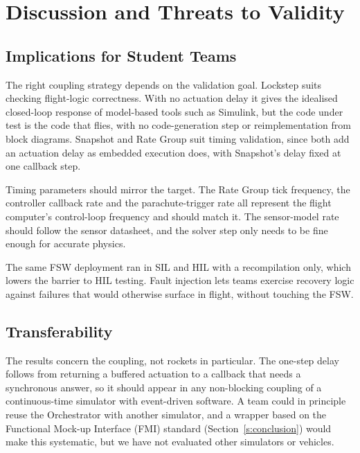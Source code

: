 \section{Discussion and Threats to Validity}\label{discussion}

\subsection{Implications for Student Teams}
The right coupling strategy depends on the validation goal. Lockstep suits checking flight-logic correctness. With no actuation delay it gives the idealised closed-loop response of model-based tools such as Simulink, but the code under test is the code that flies, with no code-generation step or reimplementation from block diagrams. Snapshot and Rate Group suit timing validation, since both add an actuation delay as embedded execution does, with Snapshot's delay fixed at one callback step.

Timing parameters should mirror the target. The Rate Group tick frequency, the controller callback rate and the parachute-trigger rate all represent the flight computer's control-loop frequency and should match it. The sensor-model rate should follow the sensor datasheet, and the solver step only needs to be fine enough for accurate physics.

The same FSW deployment ran in SIL and HIL with a recompilation only, which lowers the barrier to HIL testing. Fault injection lets teams exercise recovery logic against failures that would otherwise surface in flight, without touching the FSW.

\subsection{Transferability}
The results concern the coupling, not rockets in particular. The one-step delay follows from returning a buffered actuation to a callback that needs a synchronous answer, so it should appear in any non-blocking coupling of a continuous-time simulator with event-driven software. A team could in principle reuse the Orchestrator with another simulator, and a wrapper based on the Functional Mock-up Interface (FMI) standard (Section~\ref{s:conclusion}) would make this systematic, but we have not evaluated other simulators or vehicles.

